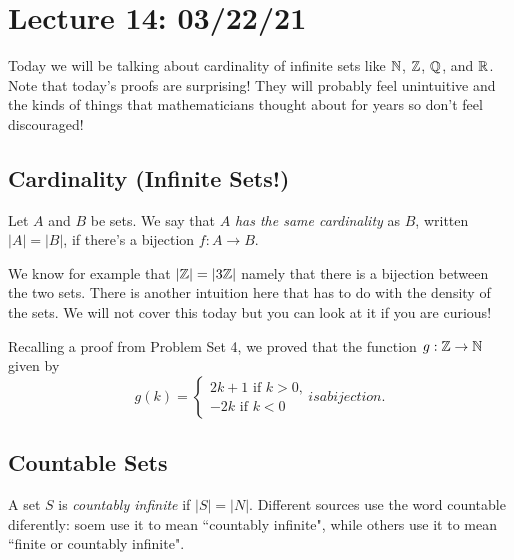 \section{Lecture 14: 03/22/21}

Today we will be talking about cardinality of infinite sets like $\mathbb{N}$, $\mathbb{Z}$, $\mathbb{Q}$, and $\mathbb{R}$. Note that today's proofs are surprising! They will probably feel unintuitive and the kinds of things that mathematicians thought about for years so don't feel discouraged! 

\subsection{Cardinality (Infinite Sets!)}

\begin{definition}
Let $A$ and $B$ be sets. We say that $A$ \textit{has the same cardinality} as $B$, written $|A|=|B|$, if there's a bijection $f:A\rightarrow B$.
\end{definition}

\begin{example}
We know for example that $|\mathbb{Z}| = |3\mathbb{Z}|$ namely that there is a bijection between the two sets. There is another intuition here that has to do with the  density of the sets. We will not cover this today but you can look at it if you are curious!
\end{example}

Recalling a proof from Problem Set 4, we proved that the function $g: \mathbb{Z} \to \mathbb{N}$ given by 
\[
g(k) = \begin{cases}
        2k+1 \text{ if $k > 0$,}
        \\
        -2k \text{ if $k < 0$}
        \end{cases}
        is a bijection. 
\]

\subsection{Countable Sets}

\begin{definition}
A set $S$ is \emph{countably infinite} if $|S| = |N|$. Different sources use the word countable diferently: soem use it to mean ``countably infinite", while others use it to mean ``finite or countably infinite". 
\end{definition}

